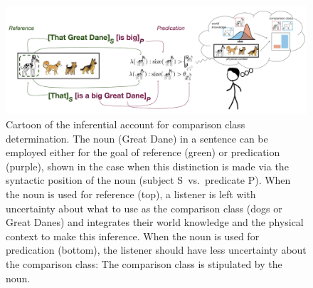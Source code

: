 \documentclass[a4paper,man,natbib]{apa6}
\begin{document}
\begin{figure}[t]
\begin{center}
\includegraphics[width=0.9\linewidth]{ref-pred-cartoon-w-subscripts2.pdf}
\end{center}
\caption{Cartoon of the inferential account for comparison class determination. The noun (Great Dane) in a sentence can be employed either for the goal of reference (green) or predication (purple), shown in the case when this distinction is made via the syntactic position of the noun (subject S~vs.~predicate P). When the noun is used for reference (top), a listener is left with uncertainty about what to use as the comparison class (dogs or Great Danes) and integrates their world knowledge and the physical context to make this inference.  When the noun is used for predication (bottom), the listener should have less uncertainty about the comparison class: The comparison class is stipulated by the noun.}
\label{model-cartoon}
\end{figure}
\end{document}
